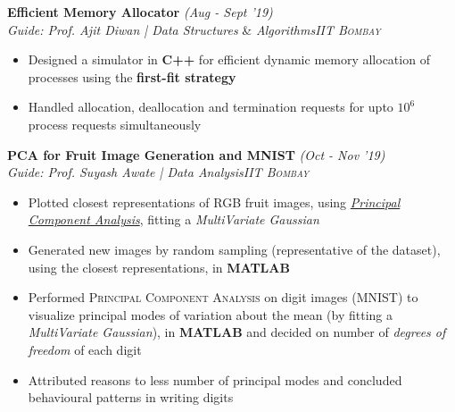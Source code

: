 \documentclass{article}
\begin{document}
\vspace{-5pt}
\textbf{Efficient Memory Allocator} \hfill{\sl \small (Aug - Sept '19)}\\{\it Guide: Prof. Ajit Diwan | Data Structures} \& {\it Algorithms}\hfill{\sl \small \textsc{IIT Bombay}}\\
\vspace{-19pt}
\begin{itemize}[itemsep = -1 mm, leftmargin=*]
  \item Designed a simulator in \textbf{C++} for efficient dynamic memory allocation of processes using the \textbf{first-fit strategy}
   \item Handled allocation, deallocation and termination requests for upto $10^{\text{6}}$ process requests simultaneously
\end{itemize}
\vspace{-5pt}
\textbf{PCA for Fruit Image Generation and MNIST} \hfill{\sl \small (Oct - Nov '19)}\\{\it Guide: Prof. Suyash Awate | Data Analysis}\hfill{\sl \small \textsc{IIT Bombay}}\\
\vspace{-19pt}
\begin{itemize}[itemsep = -1 mm, leftmargin=*]
   \item Plotted closest representations of RGB fruit images, using \textit{\underline{Principal Component Analysis}}, fitting a \textit{MultiVariate Gaussian}
    \item Generated new images by random sampling (representative of the dataset), using the closest representations, in \textbf{MATLAB}
    \item Performed \textsc{Principal Component Analysis} on digit images (MNIST) to visualize principal modes of variation about the mean (by fitting a \textit {MultiVariate Gaussian}), in \textbf{MATLAB} and decided on number of \textit{degrees of freedom} of each digit
    \item Attributed reasons to less number of principal modes and concluded behavioural patterns in writing digits
\end{itemize}
\end{document}
